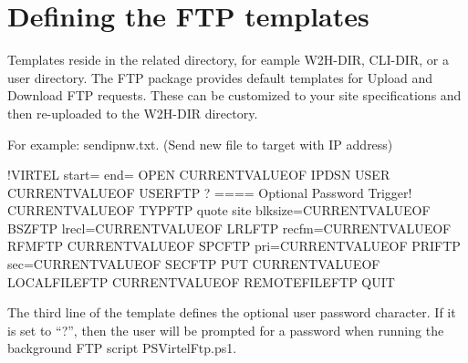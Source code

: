 \documentclass[letterpaper,10pt,english]{sphinxmanual}
\begin{document}
\section{Defining the FTP templates}
\label{\detokenize{Customization:defining-the-ftp-templates}}
Templates reside in the related directory, for eample W2H-DIR, CLI-DIR, or a user directory. The FTP package provides default templates for Upload and Download FTP requests. These can be customized to your site specifications and then re-uploaded to the W2H-DIR directory.

For example: sendipnw.txt. (Send new file to target with IP address)

\begin{sphinxVerbatim}[commandchars=\\\{\}]
\PYGZlt{}!\PYGZhy{}\PYGZhy{}VIRTEL start=\PYGZdq{}\PYGZob{}\PYGZob{}\PYGZob{}\PYGZdq{} end=\PYGZdq{}\PYGZcb{}\PYGZcb{}\PYGZcb{}\PYGZdq{} \PYGZhy{}\PYGZhy{}\PYGZgt{}OPEN \PYGZob{}\PYGZob{}\PYGZob{}CURRENT\PYGZhy{}VALUE\PYGZhy{}OF \PYGZdq{}IPDSN\PYGZdq{}\PYGZcb{}\PYGZcb{}\PYGZcb{}
USER \PYGZob{}\PYGZob{}\PYGZob{}CURRENT\PYGZhy{}VALUE\PYGZhy{}OF \PYGZdq{}USERFTP\PYGZdq{}\PYGZcb{}\PYGZcb{}\PYGZcb{}
?                                                                           \PYGZlt{}==== Optional Password Trigger!
\PYGZob{}\PYGZob{}\PYGZob{}CURRENT\PYGZhy{}VALUE\PYGZhy{}OF \PYGZdq{}TYPFTP\PYGZdq{}\PYGZcb{}\PYGZcb{}\PYGZcb{}
quote site blksize=\PYGZob{}\PYGZob{}\PYGZob{}CURRENT\PYGZhy{}VALUE\PYGZhy{}OF \PYGZdq{}BSZFTP\PYGZdq{}\PYGZcb{}\PYGZcb{}\PYGZcb{} lrecl=\PYGZob{}\PYGZob{}\PYGZob{}CURRENT\PYGZhy{}VALUE\PYGZhy{}OF \PYGZdq{}LRLFTP\PYGZdq{}\PYGZcb{}\PYGZcb{}\PYGZcb{} recfm=\PYGZob{}\PYGZob{}\PYGZob{}CURRENT\PYGZhy{}VALUE\PYGZhy{}OF \PYGZdq{}RFMFTP\PYGZdq{}\PYGZcb{}\PYGZcb{}\PYGZcb{}
\PYGZob{}\PYGZob{}\PYGZob{}CURRENT\PYGZhy{}VALUE\PYGZhy{}OF \PYGZdq{}SPCFTP\PYGZdq{}\PYGZcb{}\PYGZcb{}\PYGZcb{} pri=\PYGZob{}\PYGZob{}\PYGZob{}CURRENT\PYGZhy{}VALUE\PYGZhy{}OF \PYGZdq{}PRIFTP\PYGZdq{}\PYGZcb{}\PYGZcb{}\PYGZcb{} sec=\PYGZob{}\PYGZob{}\PYGZob{}CURRENT\PYGZhy{}VALUE\PYGZhy{}OF \PYGZdq{}SECFTP\PYGZdq{}\PYGZcb{}\PYGZcb{}\PYGZcb{}
PUT \PYGZob{}\PYGZob{}\PYGZob{}CURRENT\PYGZhy{}VALUE\PYGZhy{}OF \PYGZdq{}LOCALFILEFTP\PYGZdq{}\PYGZcb{}\PYGZcb{}\PYGZcb{} \PYGZob{}\PYGZob{}\PYGZob{}CURRENT\PYGZhy{}VALUE\PYGZhy{}OF \PYGZdq{}REMOTEFILEFTP\PYGZdq{}\PYGZcb{}\PYGZcb{}\PYGZcb{}
QUIT
\end{sphinxVerbatim}

The third line of the template defines the optional user password character. If it is set to “?”, then the user will be prompted for a password when running the background FTP script PSVirtelFtp.ps1.
\end{document}
